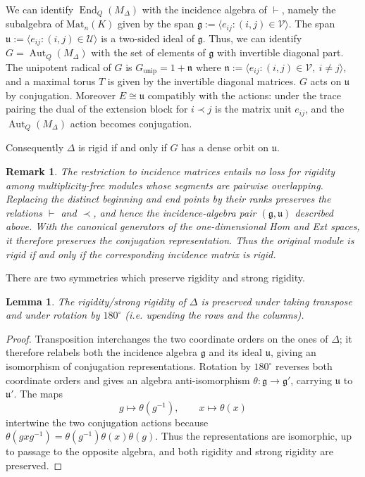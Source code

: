 \documentclass[12pt]{article}
\newtheorem{lemma}[theorem]{Lemma}
\newtheorem{remark}[theorem]{Remark}
\newcommand{\Lieg}{\mathfrak{g}}
\newcommand{\uu}{\mathfrak{u}}
\newcommand{\nn}{\mathfrak{n}}
\newcommand{\U}{\mathcal{U}}
\newcommand{\V}{\mathcal{V}}
\newcommand{\End}{\operatorname{End}}
\newcommand{\Aut}{\operatorname{Aut}}
\newcommand{\rad}[1]{#1_{\operatorname{unip}}}
\newcommand{\IM}{\Delta}
\newcommand{\homr}{\vdash}
\begin{document}
We can identify $\End_Q(M_{\IM})$ with the incidence algebra of $\homr$, namely the subalgebra of $\mathrm{Mat}_n(K)$ given by the span
$\Lieg:=\langle e_{ij}:(i,j)\in\V\rangle$.
The span
$\uu:=\langle e_{ij}:(i,j)\in\U\rangle$ is a two-sided ideal of $\Lieg$.
Thus, we can identify $G=\Aut_Q(M_{\IM})$ with the set of elements of $\Lieg$ with
invertible diagonal part.
The unipotent radical of $G$ is $\rad{G}=1+\nn$ where
$\nn:=\langle e_{ij}:(i,j)\in\V,\ i\neq j\rangle$, and a maximal torus
$T$ is given by the invertible diagonal matrices.  $G$ acts on $\uu$ by
conjugation. Moreover $E\cong\uu$ compatibly with the actions:
under the trace pairing the dual of the extension block for $i\prec j$ is the matrix unit
$e_{ij}$, and the $\Aut_Q(M_\IM)$ action becomes conjugation.

Consequently $\IM$ is rigid if and only if $G$ has a dense orbit on $\uu$.


\begin{remark}
The restriction to incidence matrices entails no loss for rigidity among
multiplicity-free modules whose segments are pairwise overlapping.
Replacing the distinct beginning and end points by their ranks preserves
the relations $\vdash$ and $\prec$, and hence the incidence-algebra pair
$(\Lieg,\uu)$ described above. With the canonical generators
of the one-dimensional Hom and Ext spaces, it therefore preserves the
conjugation representation. Thus the original module is rigid if and
only if the corresponding incidence matrix is rigid.
\end{remark}

There are two symmetries which preserve rigidity and strong rigidity.

\begin{lemma} \label{lem: symmetry}
The rigidity/strong rigidity of $\IM$ is preserved under taking transpose and under rotation by $180^\circ$ (i.e. upending the rows and the columns).
\end{lemma}

\begin{proof}
Transposition interchanges the two coordinate orders on the ones of
$\IM$; it therefore relabels both the incidence algebra $\Lieg$ and its ideal
$\uu$, giving an isomorphism of conjugation representations.  Rotation by
$180^\circ$ reverses both coordinate orders and gives an algebra anti-isomorphism
$\theta:\Lieg\to\Lieg'$, carrying $\uu$ to $\uu'$.  The maps
\[
 g\longmapsto\theta(g^{-1}),\qquad x\longmapsto\theta(x)
\]
intertwine the two conjugation actions because
$\theta(gxg^{-1})=\theta(g^{-1})\theta(x)\theta(g)$.  Thus the representations are
isomorphic, up to passage to the opposite algebra, and both rigidity and strong rigidity
are preserved.
\end{proof}
\end{document}

